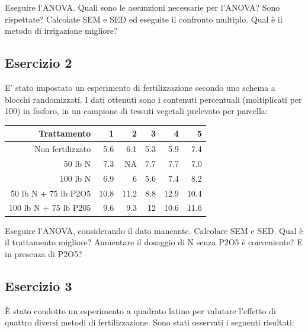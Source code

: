 \documentclass[a4paper,12pt,oneside]{book}
\begin{document}
Eseguire l'ANOVA. Quali sono le assunzioni necessarie per l'ANOVA? Sono rispettate? Calcolate SEM e SED ed eseguite il confronto multiplo. Qual è il metodo di irrigazione migliore?

\hypertarget{esercizio-2-6}{%
\subsection{Esercizio 2}\label{esercizio-2-6}}

E' stato impostato un esperimento di fertilizzazione secondo uno schema a blocchi randomizzati. I dati ottenuti sono i contenuti percentuali (moltiplicati per 100) in fosforo, in un campione di tessuti vegetali prelevato per parcella:

\begin{longtable}[]{@{}rrrrrr@{}}
\toprule
Trattamento & 1 & 2 & 3 & 4 & 5 \\
\midrule
\endhead
Non fertilizzato & 5.6 & 6.1 & 5.3 & 5.9 & 7.4 \\
50 lb N & 7.3 & NA & 7.7 & 7.7 & 7.0 \\
100 lb N & 6.9 & 6 & 5.6 & 7.4 & 8.2 \\
50 lb N + 75 lb P2O5 & 10.8 & 11.2 & 8.8 & 12.9 & 10.4 \\
100 lb N + 75 lb P205 & 9.6 & 9.3 & 12 & 10.6 & 11.6 \\
\bottomrule
\end{longtable}

Eseguire l'ANOVA, considerando il dato mancante. Calcolare SEM e SED. Qual è il trattamento migliore? Aumentare il dosaggio di N senza P2O5 è conveniente? E in presenza di P2O5?

\hypertarget{esercizio-3-6}{%
\subsection{Esercizio 3}\label{esercizio-3-6}}

È stato condotto un esperimento a quadrato latino per valutare l'effetto di quattro diversi metodi di fertilizzazione. Sono stati osservati i seguenti risultati:
\end{document}
